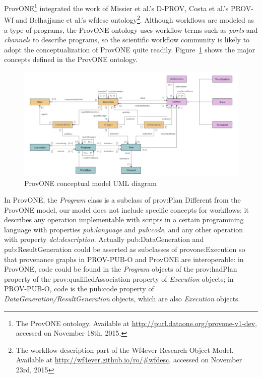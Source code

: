 ProvONE\footnote{The ProvONE ontology. Available at \url{http://purl.dataone.org/provone-v1-dev}, accessed on November 18th, 2015.} integrated the work of Missier et al.'s D-PROV, Costa et al.'s PROV-Wf and Belhajjame et al.'s wfdesc ontology\footnote{The workflow description part of the Wf4ever Research Object Model. Available at \url{http://wf4ever.github.io/ro/#wfdesc}, accessed on November 23rd, 2015}. Although workflows are modeled as a type of programs, the ProvONE ontology uses workflow terms such as \emph{ports} and \emph{channels} to describe programs, so the scientific workflow community is likely to adopt the conceptualization of ProvONE quite readily. Figure~\ref{fig:provone} shows the major concepts defined in the ProvONE ontology.
\begin{figure}
	\centering
	\includegraphics[width=\textwidth]{provone.png}
	\caption{ProvONE conceptual model UML diagram}
	\label{fig:provone}
\end{figure}
In ProvONE, the \emph{Program} class is a subclass of prov:Plan
Different from the ProvONE model, our model does not include specific concepts for workflows: it describes any operation implementable with scripts in a certain programming language with properties \emph{pub:language} and \emph{pub:code}, and any other operation with property \emph{dct:description}. Actually pub:DataGeneration and pub:ResultGeneration could be asserted as subclasses of provone:Execution so that provenance graphs in PROV-PUB-O and ProvONE are interoperable: in ProvONE, code could be found in the \emph{Program} objects of the prov:hadPlan property of the prov:qualifiedAssociation property of \emph{Execution} objects; in PROV-PUB-O, code is the pub:code property of \emph{DataGeneration/ResultGeneration} objects, which are also \emph{Execution} objects. 


